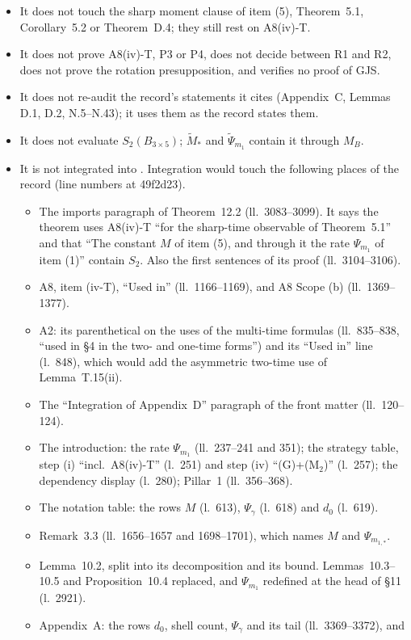 \documentclass[11pt,a4paper]{article}
\newcommand{\Mt}{\widetilde M}                %
\newcommand{\Psit}{\widetilde\Psi}
\theoremstyle{plain}
\theoremstyle{definition}
\begin{document}
\begin{itemize}
\item It does not touch the sharp moment clause of item (5), Theorem~5.1, Corollary~5.2 or
Theorem~D.4; they still rest on A8(iv)-T.
\item It does not prove A8(iv)-T, P3 or P4, does not decide between R1 and R2, does not prove the
rotation presupposition, and verifies no proof of GJS.
\item It does not re-audit the record's statements it cites (Appendix~C, Lemmas D.1, D.2,
N.5--N.43); it uses them as the record states them.
\item It does not evaluate $S_2(B_{3\times5})$; $\Mt_*$ and $\Psit_{m_1}$ contain it through
$M_B$.
\item It is not integrated into .  Integration would touch the following
places of the record (line numbers at 49f2d23).
\begin{itemize}
\item The imports paragraph of Theorem~12.2 (ll.~3083--3099).  It says the theorem uses
A8(iv)-T ``for the sharp-time observable of Theorem~5.1'' and that ``The constant $M$ of
item (5), and through it the rate $\Psi_{m_1}$ of item (1)'' contain $S_2$.  Also the first
sentences of its proof (ll.~3104--3106).
\item A8, item (iv-T), ``Used in'' (ll.~1166--1169), and A8 Scope (b) (ll.~1369--1377).
\item A2: its parenthetical on the uses of the multi-time formulas (ll.~835--838, ``used in \S4
in the two- and one-time forms'') and its ``Used in'' line (l.~848), which would add the
asymmetric two-time use of Lemma~T.15(ii).
\item The ``Integration of Appendix~D'' paragraph of the front matter (ll.~120--124).
\item The introduction: the rate $\Psi_{m_1}$ (ll.~237--241 and 351); the strategy table,
step (i) ``incl.\ A8(iv)-T'' (l.~251) and step (iv) ``(G)+(M$_2$)'' (l.~257); the dependency
display (l.~280); Pillar~1 (ll.~356--368).
\item The notation table: the rows $M$ (l.~613), $\Psi_\gamma$ (l.~618) and $d_0$ (l.~619).
\item Remark~3.3 (ll.~1656--1657 and 1698--1701), which names $M$ and $\Psi_{m_{1,*}}$.
\item Lemma~10.2, split into its decomposition and its bound.  Lemmas~10.3--10.5 and
Proposition~10.4 replaced, and $\Psi_{m_1}$ redefined at the head of \S11 (l.~2921).
\item Appendix~A: the rows $d_0$, shell count, $\Psi_\gamma$ and its tail (ll.~3369--3372), and

\end{itemize}
\end{itemize}
\end{document}
